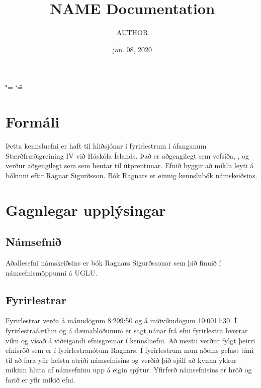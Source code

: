 \documentclass[a4paper,10pt,icelandic]{sphinxmanual}
\title{NAME Documentation}
\date{jan. 08, 2020}
\author{AUTHOR}
\begin{document}
\ifdefined\shorthandoff
  \ifnum\catcode`\=\string=\active\shorthandoff{=}\fi
  \ifnum\catcode`\"=\active{}\fi
\fi

\pagestyle{empty}
\maketitle
\pagestyle{plain}
\sphinxtableofcontents
\pagestyle{normal}
\label{\detokenize{index::doc}}



\chapter{Formáli}
\label{\detokenize{formali:formali}}\label{\detokenize{formali::doc}}
Þetta kennsluefni er haft til hliðsjónar í fyrirlestrum í áfanganum
Stærðfræðigreining IV við Háskóla Íslands. Það er aðgengilegt sem
vefsíða, , og verður aðgengilegt sem  sem hentar
til útprentunar. Efnið byggir að miklu leyti á bókinni  eftir Ragnar Sigurðsson. Bók Ragnars er einnig kennslubók námskeiðsins.



\chapter{Gagnlegar upplýsingar}
\label{\detokenize{umnamskeidid:gagnlegar-upplysingar}}\label{\detokenize{umnamskeidid::doc}}

\section{Námsefnið}
\label{\detokenize{umnamskeidid:namsefni}}
Aðallesefni námskeiðsins er bók Ragnars Sigurðssonar sem þið finnið í
námsefnismöppunni á UGLU.

\medskip


\section{Fyrirlestrar}
\label{\detokenize{umnamskeidid:fyrirlestrar}}
Fyrirlestrar verða á mánudögum 8:20\textendash{}9:50 og á miðvikudögum 10:00\textendash{}11:30.
Í fyrirlestraáætlun og á dæmablöðunum er sagt nánar frá efni fyrirlestra
hverrar viku og vísað á viðeigandi efnisgreinar í kennsluefni. Að mestu
verður fylgt þeirri efnisröð sem er í fyrirlestranótum Ragnars. Í
fyrirlestrum mun aðeins gefast tími til að fara yfir helstu atriði
námsefnisins og verðið þið sjálf að kynna ykkur mikinn hluta af
námsefninu upp á eigin spýtur. Yfirferð námsefnisins er hröð og farið er
yfir mikið efni.
\end{document}
